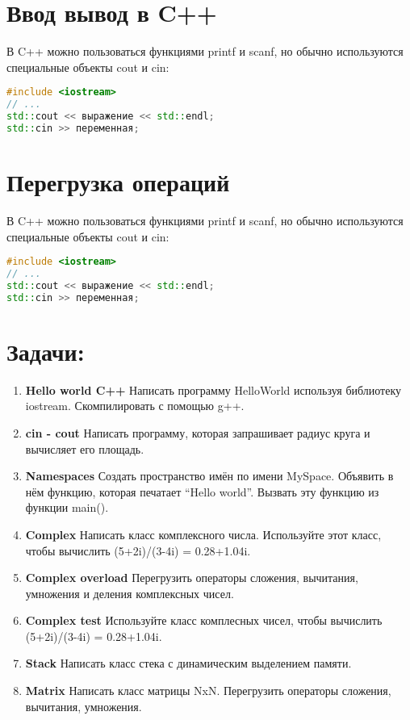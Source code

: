 \documentclass{article}
\begin{document}
\section{Ввод вывод в C++}
В C++ можно пользоваться функциями printf и scanf, но обычно используются специальные объекты cout и cin:
\begin{lstlisting}[language=C++,basicstyle=\ttfamily,keywordstyle=\color{blue}]
#include <iostream>
// ...
std::cout << выражение << std::endl;
std::cin >> переменная;
\end{lstlisting}

\section{Перегрузка операций}
В C++ можно пользоваться функциями printf и scanf, но обычно используются специальные объекты cout и cin:
\begin{lstlisting}[language=C++,basicstyle=\ttfamily,keywordstyle=\color{blue}]
#include <iostream>
// ...
std::cout << выражение << std::endl;
std::cin >> переменная;
\end{lstlisting}




\section*{Задачи:}
\begin{enumerate}
\item \textbf{Hello world C++} Написать программу HelloWorld используя библиотеку iostream. Скомпилировать с помощью g++.
\item \textbf{cin - cout} Написать программу, которая запрашивает радиус круга и вычисляет его площадь.
\item \textbf{Namespaces} Создать пространство имён по имени MySpace. Объявить в нём функцию, которая печатает ``Hello world''. Вызвать эту функцию из функции main().
\item \textbf{Complex} Написать класс комплексного числа. Используйте этот класс, чтобы вычислить (5+2i)/(3-4i) = 0.28+1.04i.
\item \textbf{Complex overload} Перегрузить операторы сложения, вычитания, умножения и деления комплексных чисел.
\item \textbf{Complex test} Используйте класс комплесных чисел, чтобы вычислить (5+2i)/(3-4i) = 0.28+1.04i. 
\item \textbf{Stack} Написать класс стека с динамическим выделением памяти.
\item \textbf{Matrix} Написать класс матрицы NxN. Перегрузить операторы сложения, вычитания, умножения.
\end{enumerate}
\end{document}
